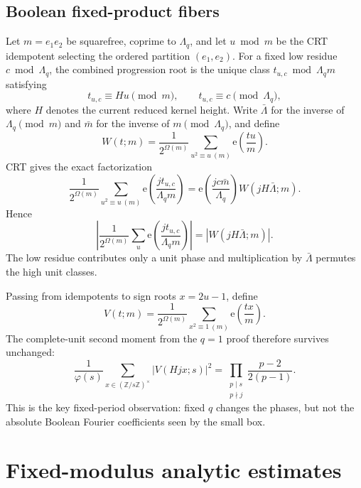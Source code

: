 \documentclass[11pt]{article}
\theoremstyle{definition}
\theoremstyle{remark}
\newcommand{\1}{\mathbf 1}
\newcommand{\e}{\mathrm e}
\newcommand{\ph}{\varphi}
\newcommand{\Om}{\Omega}
\newcommand{\Zmod}{\mathbb Z}
\begin{document}
\subsection{Boolean fixed-product fibers}

Let $m=e_1e_2$ be squarefree, coprime to $\Lambda_q$, and let $u\bmod m$ be the CRT idempotent selecting the ordered partition $(e_1,e_2)$.  For a fixed low residue $c\bmod\Lambda_q$, the combined progression root is the unique class $t_{u,c}\bmod \Lambda_qm$ satisfying
\begin{equation}\label{eq:crt-root}
t_{u,c}\equiv Hu\pmod m,
\qquad
t_{u,c}\equiv c\pmod{\Lambda_q},
\end{equation}
where $H$ denotes the current reduced kernel height.  Write $\bar\Lambda$ for the inverse of $\Lambda_q\pmod m$ and $\bar m$ for the inverse of $m\pmod{\Lambda_q}$, and define
\[
W(t;m)=\frac1{2^{\Om(m)}}
\sum_{u^2\equiv u\ (m)}\e\!\left(\frac{tu}{m}\right).
\]
CRT gives the exact factorization
\begin{equation}\label{eq:fixed-q-fourier-factorization}
\boxed{
\frac1{2^{\Om(m)}}
\sum_{u^2\equiv u\ (m)}
\e\!\left(\frac{jt_{u,c}}{\Lambda_qm}\right)
=\e\!\left(\frac{jc\bar m}{\Lambda_q}\right)
W(jH\bar\Lambda;m).
}
\end{equation}
Hence
\begin{equation}\label{eq:absolute-fourier}
\left|
\frac1{2^{\Om(m)}}
\sum_u\e\!\left(\frac{jt_{u,c}}{\Lambda_qm}\right)
\right|
=|W(jH\bar\Lambda;m)|.
\end{equation}
The low residue contributes only a unit phase and multiplication by $\bar\Lambda$ permutes the high unit classes.

Passing from idempotents to sign roots $x=2u-1$, define
\[
V(t;m)=\frac1{2^{\Om(m)}}
\sum_{x^2\equiv1\ (m)}\e\!\left(\frac{tx}{m}\right).
\]
The complete-unit second moment from the $q=1$ proof therefore survives unchanged:
\begin{equation}\label{eq:second-moment}
\frac1{\ph(s)}
\sum_{x\in(\Zmod/s\Zmod)^\times}|V(Hjx;s)|^2
=\prod_{\substack{p\mid s\\p\nmid j}}
\frac{p-2}{2(p-1)}.
\end{equation}
This is the key fixed-period observation: fixed $q$ changes the phases, but not the absolute Boolean Fourier coefficients seen by the small box.

\section{Fixed-modulus analytic estimates}\label{sec:analytic-port}
\end{document}
